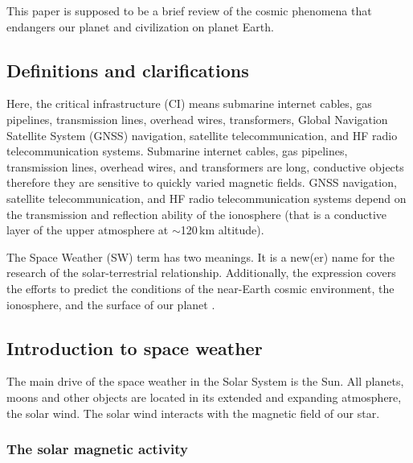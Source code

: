 \documentclass[sn-aps]{sn-jnl}%
\begin{document}
This paper is supposed to be a brief review of the cosmic phenomena that endangers our planet and civilization on planet Earth. 

\subsection{Definitions and clarifications}
\label{sec:def}

Here, the critical infrastructure (CI) means submarine internet cables, gas pipelines, transmission lines, overhead wires, transformers, Global Navigation Satellite System (GNSS) navigation, satellite telecommunication, and HF radio telecommunication systems. Submarine internet cables, gas pipelines, transmission lines, overhead wires, and transformers are long, conductive objects therefore they are sensitive to quickly varied magnetic fields. GNSS navigation, satellite telecommunication, and HF radio telecommunication systems depend on the transmission and reflection ability of the ionosphere (that is a conductive layer of the upper atmosphere at $\sim$120\,km altitude).

The Space Weather (SW) term has two meanings. It is a new(er) name for the research of the solar-terrestrial relationship. Additionally, the expression covers the efforts to predict the conditions of the near-Earth cosmic environment, the ionosphere, and the surface of our planet \cite{scherer05:_space_weath}. 


\subsection{Introduction to space weather}
\label{sec:swintro}

The main drive of the space weather in the Solar System is the Sun. All planets, moons and other objects are located in its extended and expanding atmosphere, the solar wind. The solar wind interacts with the magnetic field of our star.

\subsubsection{The solar magnetic activity}
\label{sec:magnact}
\end{document}
